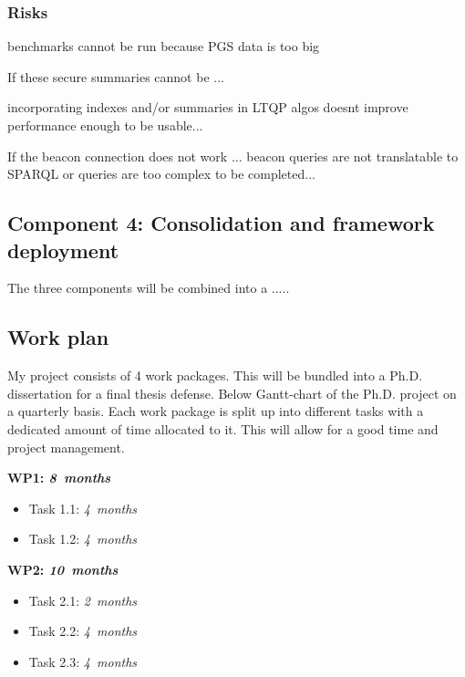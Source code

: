 \documentclass[a4paper,11pt]{article}
\begin{document}
\begin{refsection}
\subsubsection{Risks}

benchmarks cannot be run because PGS data is too big

If these secure summaries cannot be ...

incorporating indexes and/or summaries in LTQP algos doesnt improve performance enough to be usable...

If the beacon connection does not work ...
beacon queries are not translatable to SPARQL or queries are too complex to be completed...


\newcommand\WPd{Consolidation and framework deployment}
\subsection{Component 4: \WPd}

The three components will be combined into a .....


\subsection{Work plan}
\smallskip

\noindent
My project consists of 4 work packages. 
This will be bundled into a Ph.D. dissertation for a final thesis defense.
Below Gantt-chart of the Ph.D. project on a quarterly basis.  
Each work package is split up into different tasks with a dedicated amount of time allocated to it. 
This will allow for a good time and project management. 

\begin{adjustwidth}{0cm}{0cm}
	\parindent 0pt
	\newcommand\duration[1]{\hfill\emph{#1~months}}
  
	\textbf{WP1:      \WPa  \duration{8}}
	\begin{itemize}
	  \item Task 1.1: \WPaa \duration{ 4}
	  \item Task 1.2: \WPab \duration{ 4}
	\end{itemize}
	\smallskip
  
	\textbf{WP2:      \WPb  \duration{10}}
	\begin{itemize}
	  \item Task 2.1: \WPba \duration{ 2}
	  \item Task 2.2: \WPbb \duration{ 4}
	  \item Task 2.3: \WPbc \duration{ 4}
	\end{itemize}
	\smallskip
	

\end{adjustwidth}
\end{refsection}
\end{document}
